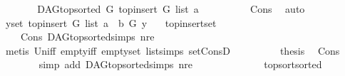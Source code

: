 \begin{isabellebody}
\ \ \ \ \isamarkupfalse%
\ \isamarkupfalse%
\ {\isachardoublequoteopen}DAG{\isachardot}{\kern0pt}top{\isacharunderscore}{\kern0pt}sorted\ G\ {\isacharparenleft}{\kern0pt}top{\isacharunderscore}{\kern0pt}insert\ G\ list\ a{\isacharparenright}{\kern0pt}{\isachardoublequoteclose}\ \isanewline
\ \ \ \ \ \ \isamarkupfalse%
\ \ Cons{\isacharparenleft}{\kern0pt}{}{\isacharcomma}{\kern0pt}{}{\isacharparenright}{\kern0pt}\ \isamarkupfalse%
\ auto\isanewline
\ \ \ \ \isamarkupfalse%
\ \isamarkupfalse%
\ {\isachardoublequoteopen}{\isacharparenleft}{\kern0pt}{\isasymforall}y{\isasymin}set\ {\isacharparenleft}{\kern0pt}top{\isacharunderscore}{\kern0pt}insert\ G\ list\ a{\isacharparenright}{\kern0pt}{\isachardot}{\kern0pt}\ {\isasymnot}\ b\ {\isasymrightarrow}\isactrlsup {\isacharplus}{\kern0pt}\isactrlbsub G\isactrlesub \ y\ {\isacharparenright}{\kern0pt}{\isachardoublequoteclose}\ \isamarkupfalse%
\ top{\isacharunderscore}{\kern0pt}insert{\isacharunderscore}{\kern0pt}set\ \isanewline
\ \ \ \ Cons\ DAG{\isachardot}{\kern0pt}top{\isacharunderscore}{\kern0pt}sorted{\isachardot}{\kern0pt}simps{\isacharparenleft}{\kern0pt}{}{\isacharparenright}{\kern0pt}\ nre\isanewline
\ \ \ \ \ \ \isamarkupfalse%
\ {\isacharparenleft}{\kern0pt}metis\ Un{\isacharunderscore}{\kern0pt}iff\ empty{\isacharunderscore}{\kern0pt}iff\ empty{\isacharunderscore}{\kern0pt}set\ list{\isachardot}{\kern0pt}simps{\isacharparenleft}{\kern0pt}{}{}{\isacharparenright}{\kern0pt}\ set{\isacharunderscore}{\kern0pt}ConsD{\isacharparenright}{\kern0pt}\ \ \isanewline
\ \ \ \ \isamarkupfalse%
\ \isamarkupfalse%
\ {\isacharquery}{\kern0pt}thesis\ \isamarkupfalse%
\ Cons{\isacharparenleft}{\kern0pt}{}{\isacharparenright}{\kern0pt}\isanewline
\ \ \ \ \ \ \isamarkupfalse%
\ {\isacharparenleft}{\kern0pt}simp\ add{\isacharcolon}{\kern0pt}\ DAG{\isachardot}{\kern0pt}top{\isacharunderscore}{\kern0pt}sorted{\isachardot}{\kern0pt}simps{\isacharparenleft}{\kern0pt}{}{\isacharparenright}{\kern0pt}\ nre{\isacharparenright}{\kern0pt}\ \ \isanewline
\ \ \isamarkupfalse%
\ \isanewline
{}\isamarkupfalse%
%
\endisatagproof
{\isafoldproof}%
%
\isadelimproof
\isanewline
%
\endisadelimproof
\ \ \ \isanewline
\ \ \isanewline
{}\isamarkupfalse%
\ top{\isacharunderscore}{\kern0pt}sort{\isacharunderscore}{\kern0pt}sorted{\isacharcolon}{\kern0pt}\isanewline

\end{isabellebody}
